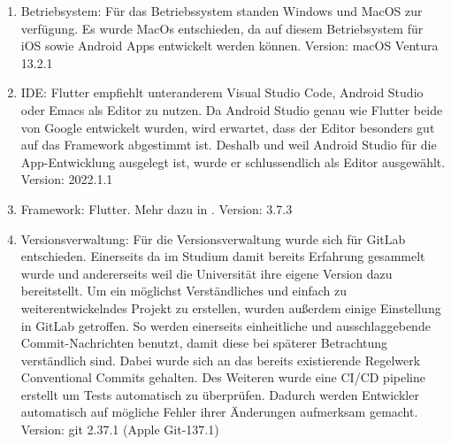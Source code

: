 \begin{enumerate}
	\item Betriebsystem: Für das Betriebssystem standen Windows und MacOS zur verfügung. Es wurde MacOs entschieden, da auf diesem Betriebsystem für iOS sowie Android Apps entwickelt werden können. Version: macOS Ventura 13.2.1%

	\item IDE: Flutter empfiehlt unteranderem Visual Studio Code, Android Studio oder Emacs als Editor zu nutzen\cite{tech_ideSuggestion}. Da Android Studio genau wie Flutter beide von Google entwickelt wurden, wird erwartet, dass der Editor besonders gut auf das Framework abgestimmt ist. Deshalb und weil Android Studio für die App-Entwicklung ausgelegt ist, wurde er schlussendlich als Editor ausgewählt. Version: 2022.1.1%

	\item Framework: Flutter. Mehr dazu in . Version: 3.7.3%

	\item Versionsverwaltung: 
		Für die Versionsverwaltung wurde sich für GitLab entschieden. %
		Einerseits da im Studium damit bereits Erfahrung gesammelt wurde und andererseits weil die Universität ihre eigene Version dazu bereitstellt.\newline%
		Um ein möglichst Verständliches und einfach zu weiterentwickelndes Projekt zu erstellen, wurden außerdem einige Einstellung in GitLab getroffen. %
			So werden einerseits einheitliche und ausschlaggebende Commit-Nachrichten benutzt, damit diese bei späterer Betrachtung verständlich sind. Dabei wurde sich an das bereits existierende Regelwerk \glqq Conventional Commits\grqq{}\cite{tech_conventionalCommits} gehalten. %
			Des Weiteren wurde eine CI/CD pipeline erstellt um Tests automatisch zu überprüfen. Dadurch werden Entwickler automatisch auf mögliche Fehler ihrer Änderungen aufmerksam gemacht. %
			Version: git 2.37.1 (Apple Git-137.1)


\end{enumerate}
